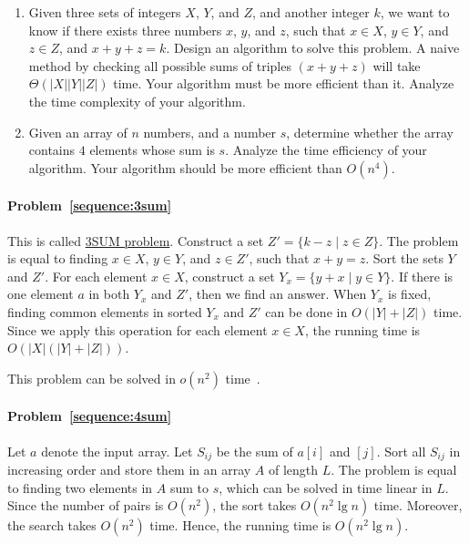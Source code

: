 \begin{Exercise}
\begin{enumerate}
\item Given three sets of integers $X$, $Y$, and $Z$, and another integer $k$, we want to know if there exists three numbers $x$, $y$, and $z$, such that $x \in X$, $y \in Y$, and $z \in Z$, and $x + y + z = k$. Design an algorithm to solve this problem. A naive method by checking all possible sums of triples $(x+y+z)$ will take $\Theta(|X||Y||Z|)$ time. Your algorithm must be more efficient than it. Analyze the time complexity of your algorithm. \label{sequence:3sum} 
\item Given an array of $n$ numbers, and a number $s$, determine whether the array contains $4$ elements whose sum is $s$. Analyze the time efficiency of your algorithm. Your algorithm should be more efficient than $O(n^4)$.  \label{sequence:4sum}  
\end{enumerate}
\end{Exercise}
\begin{Answer}
\paragraph{Problem~\ref{sequence:3sum}} This is called \href{https://en.wikipedia.org/wiki/3SUM}{3SUM problem}. Construct a set $Z' = \{k - z \mid z \in Z\}$. The problem is equal to finding $x \in X$, $y \in Y$, and $z \in Z'$, such that $x + y = z$. Sort the sets $Y$ and $Z'$. For each element $x \in X$, construct a set $Y_x = \{y + x \mid y \in Y\}$. If there is one element $a$ in both  $Y_x$ and $Z'$, then we find an answer. When $Y_x$ is fixed, finding common elements in sorted $Y_x$ and $Z'$ can be done in $O(|Y|+|Z|)$ time. Since we apply this operation for each element $x \in X$, the running time is $O(|X|(|Y|+|Z|))$.

This problem can be solved in $o(n^2)$ time~\cite{Jorgensen2014}.

\paragraph{Problem~\ref{sequence:4sum}} Let $a$ denote the input array. Let $S_{ij}$ be the sum of $a[i]$ and $[j]$. Sort all $S_{ij}$ in increasing order and store them in an array $A$ of length $L$. The problem is equal to finding two elements in $A$ sum to $s$, which can be solved in time linear in $L$. Since the number of pairs is $O(n^2)$, the sort takes $O(n^2 \lg n)$ time. Moreover, the search takes $O(n^2)$ time. Hence, the running time is $O(n^2 \lg n)$.
\end{Answer}

